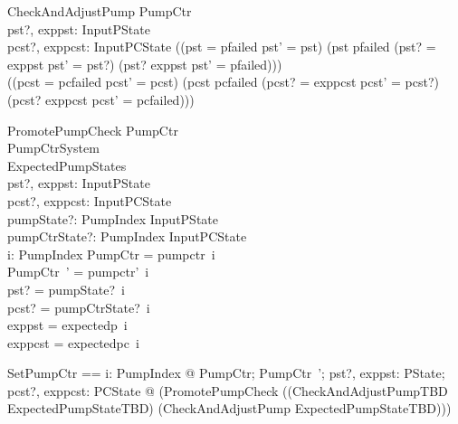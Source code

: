 \documentclass{report} %
\begin{document}
\begin{schema}{CheckAndAdjustPump}
  \Delta PumpCtr \\ %
  pst?, exppst: InputPState \\ %
  pcst?, exppcst: InputPCState
  \where %
  ((pst = pfailed \land pst' = pst) \lor (pst \neq pfailed \land 
    (pst? = exppst \implies pst' = pst?) \land 
    (pst? \neq exppst \implies pst' = pfailed))) \\
  ((pcst = pcfailed \land pcst' = pcst) \lor (pcst \neq pcfailed \land 
    (pcst? = exppcst \implies pcst' = pcst?) \land 
    (pcst? \neq exppcst \implies pcst' = pcfailed))) \\
\end{schema}

\begin{schema}{PromotePumpCheck}
  \Delta PumpCtr \\ %
  \Delta PumpCtrSystem \\ %
  ExpectedPumpStates \\ %
  pst?, exppst: InputPState \\ %
  pcst?, exppcst: InputPCState \\ %
  pumpState?: PumpIndex \fun InputPState \\ %
  pumpCtrState?: PumpIndex \fun InputPCState \\ %
  i: PumpIndex
  \where %
  \theta PumpCtr = pumpctr~i \\ %
  \theta PumpCtr~' = pumpctr'~i \\ %
  pst? = pumpState?~i \\ %
  pcst? = pumpCtrState?~i \\ %
  exppst = expectedp~i \\ %
  exppcst = expectedpc~i
\end{schema}

\begin{zed}
  SetPumpCtr == \forall i: PumpIndex @
    \exists PumpCtr; PumpCtr~'; pst?, exppst: PState; pcst?, exppcst: PCState %
      @ (PromotePumpCheck \land ((CheckAndAdjustPumpTBD \land ExpectedPumpStateTBD) \lor (CheckAndAdjustPump \land \lnot ExpectedPumpStateTBD)))
\end{zed}
\end{document}
